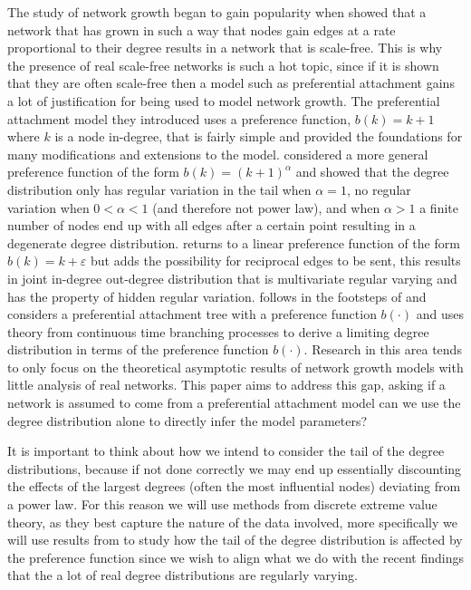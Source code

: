 \documentclass[
  sn-basic,
]{sn-jnl}
\theoremstyle{plain}
\theoremstyle{plain}
\theoremstyle{remark}
\begin{document}
The study of network growth began to gain popularity when
\citet{Barabasi99} showed that a network that has grown in such a way
that nodes gain edges at a rate proportional to their degree results in
a network that is scale-free. This is why the presence of real
scale-free networks is such a hot topic, since if it is shown that they
are often scale-free then a model such as preferential attachment gains
a lot of justification for being used to model network growth. The
preferential attachment model they introduced uses a preference
function, \(b(k)=k+1\) where \(k\) is a node in-degree, that is fairly
simple and provided the foundations for many modifications and
extensions to the model. \citet{krapivsky01} considered a more general
preference function of the form \(b(k) = (k+1)^\alpha\) and showed that
the degree distribution only has regular variation in the tail when
\(\alpha=1\), no regular variation when \(0<\alpha<1\) (and therefore
not power law), and when \(\alpha>1\) a finite number of nodes end up
with all edges after a certain point resulting in a degenerate degree
distribution. \citet{wang2022random} returns to a linear preference
function of the form \(b(k) = k+\varepsilon\) but adds the possibility
for reciprocal edges to be sent, this results in joint in-degree
out-degree distribution that is multivariate regular varying and has the
property of hidden regular variation. \citet{rudas07} follows in the
footsteps of \citet{krapivsky01} and considers a preferential attachment
tree with a preference function \(b(\cdot)\) and uses theory from
continuous time branching processes to derive a limiting degree
distribution in terms of the preference function \(b(\cdot)\). Research
in this area tends to only focus on the theoretical asymptotic results
of network growth models with little analysis of real networks. This
paper aims to address this gap, asking if a network is assumed to come
from a preferential attachment model can we use the degree distribution
alone to directly infer the model parameters?

It is important to think about how we intend to consider the tail of the
degree distributions, because if not done correctly we may end up
essentially discounting the effects of the largest degrees (often the
most influential nodes) deviating from a power law. For this reason we
will use methods from discrete extreme value theory, as they best
capture the nature of the data involved, more specifically we will use
results from \citet{shimura12} to study how the tail of the degree
distribution is affected by the preference function since we wish to
align what we do with the recent findings that the a lot of real degree
distributions are regularly varying.
\end{document}
